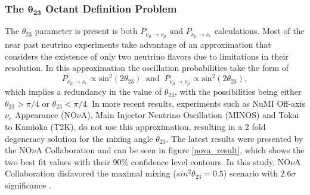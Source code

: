 \subsubsection{The $\mathbf{\theta_{23}}$ Octant Definition Problem}
%
The $\theta_{23}$ parameter is present is both $P_{\nu_\mu \rightarrow \nu_\mu}$ and $P_{\nu_\mu \rightarrow \nu_e}$ calculations. Most of the near past neutrino experiments take advantage of an approximation that considers the existence of only two neutrino flavors due to limitations in their resolution. In this approximation the oscillation probabilities take the form of
%
\begin{equation}
	P_{\nu_\mu \rightarrow \nu_e} \propto \text{sin}^2(2\theta_{23}) \ \text{ and } \ P_{\nu_\mu \rightarrow \nu_\mu} \propto \text{sin}^2(2\theta_{23}),
	\nonumber
\end{equation}
%
which implies a redundancy in the value of $\theta_{23}$, with the possibilities being either $\theta_{23} > \pi/4$ or $\theta_{23} < \pi/4$. 
In more recent results, experiments such as NuMI Off-axis $\nu_e$ Appearance (NO$\nu$A), Main Injector Neutrino Oscillation (MINOS) and Tokai to Kamioka (T2K), do not use this approximation, resulting in a 2 fold degeneracy solution for the mixing angle $\theta_{23}$. The latest results were presented by the NO$\nu$A Collaboration and can be seen in figure \ref{nova_result}, which shows the two best fit values with their 90\% confidence level contours. In this study, NO$\nu$A Collaboration disfavored the maximal mixing ($sin^2 \theta_{23} = 0.5$) scenario with $2.6 \sigma$ significance \cite{NOVA}.
%
